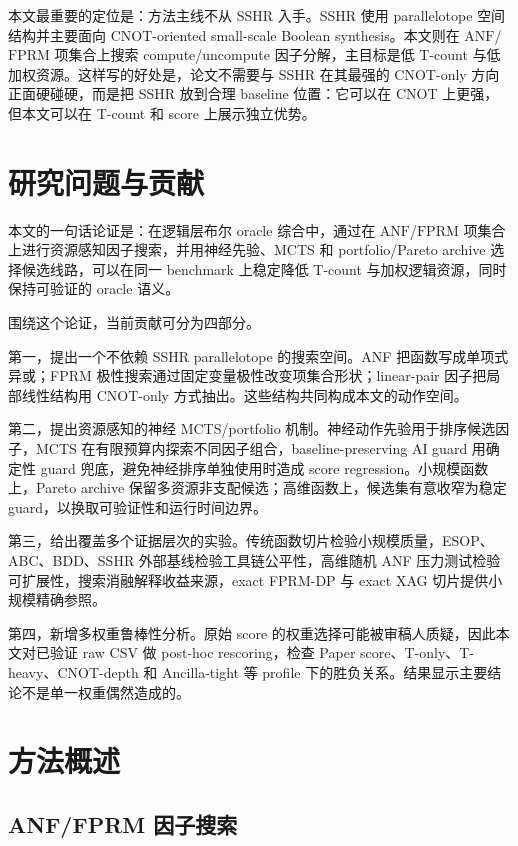 \documentclass[UTF8,fontset=macnew,11pt]{ctexart}
\newcommand{\anf}{\ensuremath{\mathrm{ANF}}}
\newcommand{\fprm}{\ensuremath{\mathrm{FPRM}}}
\begin{document}
本文最重要的定位是：方法主线不从 SSHR 入手。SSHR 使用 parallelotope 空间结构并主要面向 CNOT-oriented small-scale Boolean synthesis。本文则在 \anf{}/\fprm{} 项集合上搜索 compute/uncompute 因子分解，主目标是低 T-count 与低加权资源。这样写的好处是，论文不需要与 SSHR 在其最强的 CNOT-only 方向正面硬碰硬，而是把 SSHR 放到合理 baseline 位置：它可以在 CNOT 上更强，但本文可以在 T-count 和 score 上展示独立优势。

\section{研究问题与贡献}

本文的一句话论证是：在逻辑层布尔 oracle 综合中，通过在 \anf{}/\fprm{} 项集合上进行资源感知因子搜索，并用神经先验、MCTS 和 portfolio/Pareto archive 选择候选线路，可以在同一 benchmark 上稳定降低 T-count 与加权逻辑资源，同时保持可验证的 oracle 语义。

围绕这个论证，当前贡献可分为四部分。

第一，提出一个不依赖 SSHR parallelotope 的搜索空间。ANF 把函数写成单项式异或；FPRM 极性搜索通过固定变量极性改变项集合形状；linear-pair 因子把局部线性结构用 CNOT-only 方式抽出。这些结构共同构成本文的动作空间。

第二，提出资源感知的神经 MCTS/portfolio 机制。神经动作先验用于排序候选因子，MCTS 在有限预算内探索不同因子组合，baseline-preserving AI guard 用确定性 guard 兜底，避免神经排序单独使用时造成 score regression。小规模函数上，Pareto archive 保留多资源非支配候选；高维函数上，候选集有意收窄为稳定 guard，以换取可验证性和运行时间边界。

第三，给出覆盖多个证据层次的实验。传统函数切片检验小规模质量，ESOP、ABC、BDD、SSHR 外部基线检验工具链公平性，高维随机 ANF 压力测试检验可扩展性，搜索消融解释收益来源，exact FPRM-DP 与 exact XAG 切片提供小规模精确参照。

第四，新增多权重鲁棒性分析。原始 score 的权重选择可能被审稿人质疑，因此本文对已验证 raw CSV 做 post-hoc rescoring，检查 Paper score、T-only、T-heavy、CNOT-depth 和 Ancilla-tight 等 profile 下的胜负关系。结果显示主要结论不是单一权重偶然造成的。

\section{方法概述}

\subsection{ANF/FPRM 因子搜索}
\end{document}
